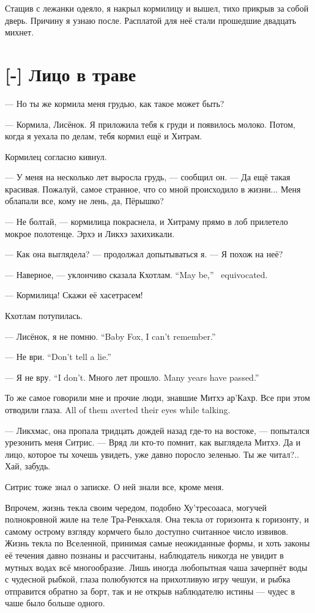 Стащив с лежанки одеяло, я накрыл кормилицу и вышел, тихо прикрыв за собой дверь.
Причину я узнаю после.
Расплатой для неё стали прошедшие двадцать михнет.

\section{[-] Лицо в траве}

\textspace

--- Но ты же кормила меня грудью, как такое может быть?

--- Кормила, Лисёнок.
Я приложила тебя к груди и появилось молоко.
Потом, когда я уехала по делам, тебя кормил ещё и Хитрам.

Кормилец согласно кивнул.

--- У меня на несколько лет выросла грудь, --- сообщил он.
--- Да ещё такая красивая.
Пожалуй, самое странное, что со мной происходило в жизни...
Меня облапали все, кому не лень, да, Пёрышко?

--- Не болтай, --- кормилица покраснела, и Хитраму прямо в лоб прилетело мокрое полотенце.
Эрхэ и Ликхэ захихикали.

--- Как она выглядела? --- продолжал допытываться я.
--- Я похож на неё?

{--- Наверное, --- уклончиво сказала Кхотлам.}
{``May be,'' \Kchotlam\ equivocated.}

--- Кормилица!
Скажи её хасетрасем!

Кхотлам потупилась.

{--- Лисёнок, я не помню.}
{``Baby Fox, I can't remember.''}

{--- Не ври.}
{``Don't tell a lie.''}

{--- Я не вру.}
{``I don't.}
{Много лет прошло.}
{Many years have passed.''}

То же самое говорили мне и прочие люди, знавшие Митхэ ар’Кахр.
{Все при этом отводили глаза.}
{All of them averted their eyes while talking.}

--- Ликхмас, она пропала тридцать дождей назад где-то на востоке, --- попытался урезонить меня Ситрис.
--- Вряд ли кто-то помнит, как выглядела Митхэ.
Да и лицо, которое ты хочешь увидеть, уже давно поросло зеленью.
Ты же читал?..
Хай, забудь.

Ситрис тоже знал о записке.
О ней знали все, кроме меня.

Впрочем, жизнь текла своим чередом, подобно Ху'тресоааса, могучей полнокровной жиле на теле Тра-Ренкхаля.
Она текла от горизонта к горизонту, и самому острому взгляду кормчего было доступно считанное число извивов.
Жизнь текла по Вселенной, принимая самые неожиданные формы, и хоть законы её течения давно познаны и рассчитаны, наблюдатель никогда не увидит в мутных водах всё многообразие.
Лишь иногда любопытная чаша зачерпнёт воды с чудесной рыбкой, глаза полюбуются на прихотливую игру чешуи, и рыбка отправится обратно за борт, так и не открыв наблюдателю истины --- чудес в чаше было больше одного.

